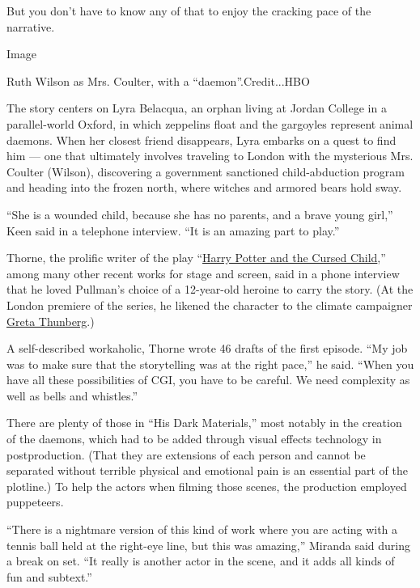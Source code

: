 But you don't have to know any of that to enjoy the cracking pace of the
narrative.

Image

Ruth Wilson as Mrs. Coulter, with a ``daemon''.Credit...HBO

The story centers on Lyra Belacqua, an orphan living at Jordan College
in a parallel-world Oxford, in which zeppelins float and the gargoyles
represent animal daemons. When her closest friend disappears, Lyra
embarks on a quest to find him --- one that ultimately involves
traveling to London with the mysterious Mrs. Coulter (Wilson),
discovering a government sanctioned child-abduction program and heading
into the frozen north, where witches and armored bears hold sway.

``She is a wounded child, because she has no parents, and a brave young
girl,'' Keen said in a telephone interview. ``It is an amazing part to
play.''

Thorne, the prolific writer of the play
``\href{https://www.nytimes.com/2016/08/02/books/harry-potter-and-the-cursed-child-review.html?searchResultPosition=6}{Harry
Potter and the Cursed Child},'' among many other recent works for stage
and screen, said in a phone interview that he loved Pullman's choice of
a 12-year-old heroine to carry the story. (At the London premiere of the
series, he likened the character to the climate campaigner
\href{https://www.nytimes.com/2019/09/24/climate/greta-thunberg-un.html}{Greta
Thunberg}.)

A self-described workaholic, Thorne wrote 46 drafts of the first
episode. ``My job was to make sure that the storytelling was at the
right pace,'' he said. ``When you have all these possibilities of CGI,
you have to be careful. We need complexity as well as bells and
whistles.''

There are plenty of those in ``His Dark Materials,'' most notably in the
creation of the daemons, which had to be added through visual effects
technology in postproduction. (That they are extensions of each person
and cannot be separated without terrible physical and emotional pain is
an essential part of the plotline.) To help the actors when filming
those scenes, the production employed puppeteers.

``There is a nightmare version of this kind of work where you are acting
with a tennis ball held at the right-eye line, but this was amazing,''
Miranda said during a break on set. ``It really is another actor in the
scene, and it adds all kinds of fun and subtext.''

